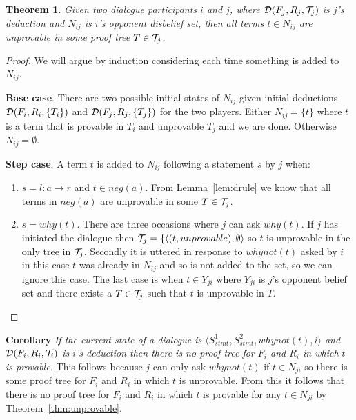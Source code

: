\documentclass{blue-book}
\newtheorem{theorem}{Theorem}
\newcommand{\drule}[3]{\ensuremath{#1:#2 \rightarrow #3}}
\newcommand{\pt}[2]{\ensuremath{\langle #1,#2 \rangle}}
\newcommand{\node}[2]{\ensuremath{(#1, #2)}}
\newcommand{\deduction}[3]{\ensuremath{{\cal D}(#1, #2, #3)}}
\begin{document}
\begin{theorem}
\label{thm:Ncorrect}
Given two dialogue participants $i$ and $j$, where $\deduction{F_j}{R_j}{{\cal T}_j}$ is $j$'s deduction and $N_{ij}$ is $i$'s opponent disbelief set, then all terms $t \in N_{ij}$ are unprovable in some proof tree $T \in {\cal T}_j$.
\end{theorem}
\begin{proof}
We will argue by induction considering each time something is added to $N_{ij}$.

{\bf Base case}.  There are two possible initial states of $N_{ij}$ given initial deductions $\deduction{F_i}{R_i}{\{T_i\}}$ and $\deduction{F_j}{R_j}{\{T_j\}}$ for the two players.  Either $N_{ij} = \{t\}$ where $t$ is a term that is provable in $T_i$ and unprovable $T_j$ and we are done.  Otherwise $N_{ij} = \emptyset$.

{\bf Step case}.  A term $t$ is added to $N_{ij}$ following a statement $s$ by $j$ when:
\begin{enumerate}
\item $s = \drule{l}{a}{r}$ and $t \in neg(a)$.  From Lemma~\ref{lem:drule} we know that all terms in $neg(a)$ are unprovable in some $T \in {\cal T}_j$.  
\item $s = why(t)$.  There are three occasions where $j$ can ask $why(t)$.  If $j$ has initiated the dialogue then ${\cal T}_j = \{\pt{\node{t}{unprovable}}{\emptyset}$ so $t$ is unprovable in the only tree in ${\cal T}_j$.  Secondly it is uttered in response to $whynot(t)$ asked by $i$ in this case $t$ was already in $N_{ij}$ and so is not added to the set, so we can ignore this case.  The last case is when $t \in Y_{ji}$ where $Y_{ji}$ is $j$'s opponent belief set and there exists a $T \in {\cal T}_j$ such that $t$ is unprovable in $T$.
\end{enumerate}
\end{proof}

{\bf Corollary} \emph{If the current state of a dialogue is $\langle S^1_{stmt}, S^2_{stmt}, whynot(t), i\rangle$ and $\deduction{F_i}{R_i}{{\cal T}_i}$ is $i$'s deduction then there is no proof tree for $F_i$ and $R_i$ in which $t$ is provable.}  This follows because $j$ can only ask $whynot(t)$ if $t \in N_{ji}$ so there is some proof tree for $F_i$ and $R_i$ in which $t$ is unprovable.  From this it follows that there is no proof tree for $F_i$ and $R_i$ in which $t$ is provable for any $t \in N_{ji}$ by Theorem~\ref{thm:unprovable}.
\end{document}
